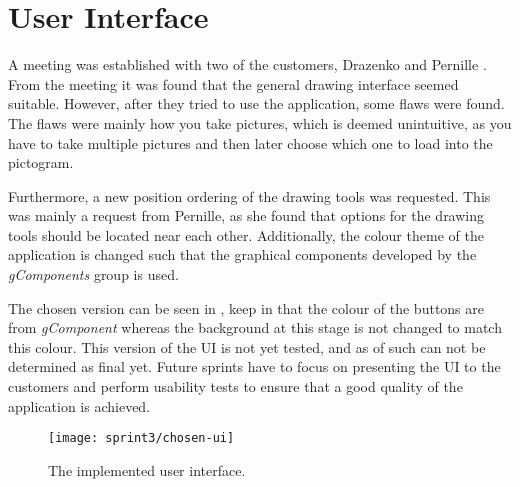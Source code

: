 \section{User Interface}
A meeting was established with two of the customers, Drazenko and Pernille \citep{misc:drazenko, misc:pernille}.
From the meeting it was found that the general drawing interface seemed suitable.
However, after they tried to use the application, some flaws were found.
The flaws were mainly how you take pictures, which is deemed unintuitive, as you have to take multiple pictures and then later choose which one to load into the pictogram.

Furthermore, a new position ordering of the drawing tools was requested.
This was mainly a request from Pernille, as she found that options for the drawing tools should be located near each other.
Additionally, the colour theme of the application is changed such that the graphical components developed by the \textit{gComponents} group is used.

The chosen version can be seen in , keep in that the colour of the buttons are from \textit{gComponent} whereas the background at this stage is not changed to match this colour.
This version of the UI is not yet tested, and as of such can not be determined as final yet.
Future sprints have to focus on presenting the UI to the customers and perform usability tests to ensure that a good quality of the application is achieved.

\begin{figure}[h]
     \centering
     \texttt{[image: sprint3/chosen-ui]}
     \caption{The implemented user interface.}
     \label{fig:chosen-ui}
\end{figure}


%